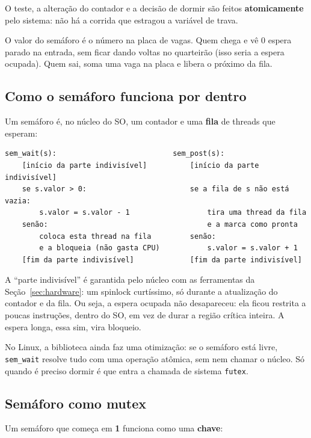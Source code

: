 \documentclass[11pt,a4paper]{article}
\newcommand{\cmd}[1]{\texttt{#1}}
\begin{document}
O teste, a alteração do contador e a decisão de dormir são feitos \textbf{atomicamente} pelo sistema: não há a corrida que estragou a variável de trava.

\begin{exemplo}
O valor do semáforo é o número na placa de vagas. Quem chega e vê 0 espera parado na entrada, sem ficar dando voltas no quarteirão (isso seria a espera ocupada). Quem sai, soma uma vaga na placa e libera o próximo da fila.
\end{exemplo}

\subsection{Como o semáforo funciona por dentro}

Um semáforo é, no núcleo do SO, um contador e uma \textbf{fila} de threads que esperam:

\begin{lstlisting}[style=terminal]
sem_wait(s):                           sem_post(s):
    [início da parte indivisível]          [início da parte indivisível]
    se s.valor > 0:                        se a fila de s não está vazia:
        s.valor = s.valor - 1                  tira uma thread da fila
    senão:                                     e a marca como pronta
        coloca esta thread na fila         senão:
        e a bloqueia (não gasta CPU)           s.valor = s.valor + 1
    [fim da parte indivisível]             [fim da parte indivisível]
\end{lstlisting}

A ``parte indivisível'' é garantida pelo núcleo com as ferramentas da Seção~\ref{sec:hardware}: um spinlock curtíssimo, só durante a atualização do contador e da fila. Ou seja, a espera ocupada não desapareceu: ela ficou restrita a poucas instruções, dentro do SO, em vez de durar a região crítica inteira. A espera longa, essa sim, vira bloqueio.

No Linux, a biblioteca ainda faz uma otimização: se o semáforo está livre, \cmd{sem\_wait} resolve tudo com uma operação atômica, sem nem chamar o núcleo. Só quando é preciso dormir é que entra a chamada de sistema \cmd{futex}.

\subsection{Semáforo como mutex}

Um semáforo que começa em \textbf{1} funciona como uma \textbf{chave}:
\end{document}
